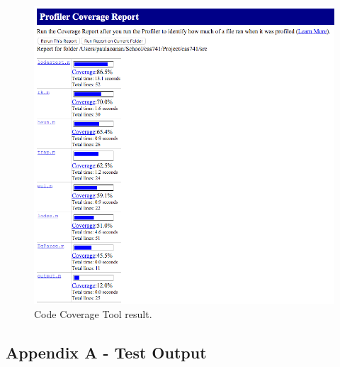 \documentclass[12pt, titlepage]{article}
\begin{document}
\begin{figure}[H]
 \includegraphics[width=\linewidth]{images/CCM}
  \caption{Code Coverage Tool result.}
  \label{fig:CCM}
\end{figure}





\newpage
\begin{landscape}
\section{Appendix A - Test Output} \label{app_a}

\end{landscape}
\end{document}
